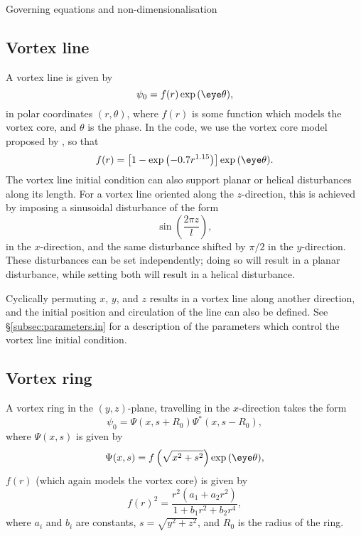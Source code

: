 \begin{chapter}{\label{cha:equations}Governing equations and
  non-dimensionalisation}
  \subsection{Vortex line}
  A vortex line is given by
  \begin{equation*}
    \psi_{0} = f(r) \exp{(\eye \theta)},
  \end{equation*}
  in polar coordinates $(r, \theta)$, where $f(r)$ is some function which
  models the vortex core, and $\theta$ is the phase.  In the code, we use the
  vortex core model proposed by \citet{BR01}, so that
  \begin{equation*}
    f(r) = \left[ 1 - \exp{\left( -0.7r^{1.15}\right)} \right] \exp{(\eye
    \theta)}.
  \end{equation*}
  The vortex line initial condition can also support planar or helical
  disturbances along its length.  For a vortex line oriented along the
  $z$-direction, this is achieved by imposing a sinusoidal
  disturbance of the form
  \begin{equation*}
    \sin{\left( \frac{2\pi z}{l} \right)},
  \end{equation*}
  in the $x$-direction, and the same disturbance shifted by $\pi/2$ in the
  $y$-direction.  These disturbances can be set independently; doing so will
  result in a planar disturbance, while setting both will result in a helical
  disturbance.

  Cyclically permuting $x$, $y$, and $z$ results in a vortex line along another
  direction, and the initial position and circulation of the line can also be
  defined.  See \S\ref{subsec:parameters.in} for a description of the
  parameters which control the vortex line initial condition.

  \subsection{Vortex ring}
  A vortex ring in the $(y,z)$-plane, travelling in the $x$-direction takes the
  form \citep{Berloff04}
  \begin{equation*}
    \psi_{0} = \Psi(x, s+R_{0}) \Psi^{*}(x, s-R_{0}),
  \end{equation*}
  where $\Psi(x,s)$ is given by
  \begin{equation*}
    \Psi(x,s) = f\left( \sqrt{x^{2}+s^{2}} \right) \exp{(\eye \theta)},
  \end{equation*}
  $f(r)$ (which again models the vortex core) is given by
  \begin{equation*}
    f(r)^{2} = \frac{r^{2}\left( a_{1} + a_{2}r^{2} \right)}{1 + b_{1}r^{2} +
    b_{2}r^{4}},
  \end{equation*}
  where $a_{i}$ and $b_{i}$ are constants, $s = \sqrt{y^{2} + z^{2}}$, and
  $R_{0}$ is the radius of the ring.


\end{chapter}
